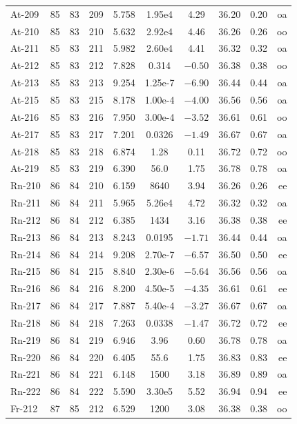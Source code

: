 \begin{longtable}{lccccccccr}
At-209 & 85 & 83 & 209 & 5.758 & 1.95e4 & 4.29 & 36.20 & 0.20 & oa \\
At-210 & 85 & 83 & 210 & 5.632 & 2.92e4 & 4.46 & 36.26 & 0.26 & oo \\
At-211 & 85 & 83 & 211 & 5.982 & 2.60e4 & 4.41 & 36.32 & 0.32 & oa \\
At-212 & 85 & 83 & 212 & 7.828 & 0.314 & $-0.50$ & 36.38 & 0.38 & oo \\
At-213 & 85 & 83 & 213 & 9.254 & 1.25e-7 & $-6.90$ & 36.44 & 0.44 & oa \\
At-215 & 85 & 83 & 215 & 8.178 & 1.00e-4 & $-4.00$ & 36.56 & 0.56 & oa \\
At-216 & 85 & 83 & 216 & 7.950 & 3.00e-4 & $-3.52$ & 36.61 & 0.61 & oo \\
At-217 & 85 & 83 & 217 & 7.201 & 0.0326 & $-1.49$ & 36.67 & 0.67 & oa \\
At-218 & 85 & 83 & 218 & 6.874 & 1.28 & 0.11 & 36.72 & 0.72 & oo \\
At-219 & 85 & 83 & 219 & 6.390 & 56.0 & 1.75 & 36.78 & 0.78 & oa \\
Rn-210 & 86 & 84 & 210 & 6.159 & 8640 & 3.94 & 36.26 & 0.26 & ee \\
Rn-211 & 86 & 84 & 211 & 5.965 & 5.26e4 & 4.72 & 36.32 & 0.32 & oa \\
Rn-212 & 86 & 84 & 212 & 6.385 & 1434 & 3.16 & 36.38 & 0.38 & ee \\
Rn-213 & 86 & 84 & 213 & 8.243 & 0.0195 & $-1.71$ & 36.44 & 0.44 & oa \\
Rn-214 & 86 & 84 & 214 & 9.208 & 2.70e-7 & $-6.57$ & 36.50 & 0.50 & ee \\
Rn-215 & 86 & 84 & 215 & 8.840 & 2.30e-6 & $-5.64$ & 36.56 & 0.56 & oa \\
Rn-216 & 86 & 84 & 216 & 8.200 & 4.50e-5 & $-4.35$ & 36.61 & 0.61 & ee \\
Rn-217 & 86 & 84 & 217 & 7.887 & 5.40e-4 & $-3.27$ & 36.67 & 0.67 & oa \\
Rn-218 & 86 & 84 & 218 & 7.263 & 0.0338 & $-1.47$ & 36.72 & 0.72 & ee \\
Rn-219 & 86 & 84 & 219 & 6.946 & 3.96 & 0.60 & 36.78 & 0.78 & oa \\
Rn-220 & 86 & 84 & 220 & 6.405 & 55.6 & 1.75 & 36.83 & 0.83 & ee \\
Rn-221 & 86 & 84 & 221 & 6.148 & 1500 & 3.18 & 36.89 & 0.89 & oa \\
Rn-222 & 86 & 84 & 222 & 5.590 & 3.30e5 & 5.52 & 36.94 & 0.94 & ee \\
Fr-212 & 87 & 85 & 212 & 6.529 & 1200 & 3.08 & 36.38 & 0.38 & oo \\

\end{longtable}
